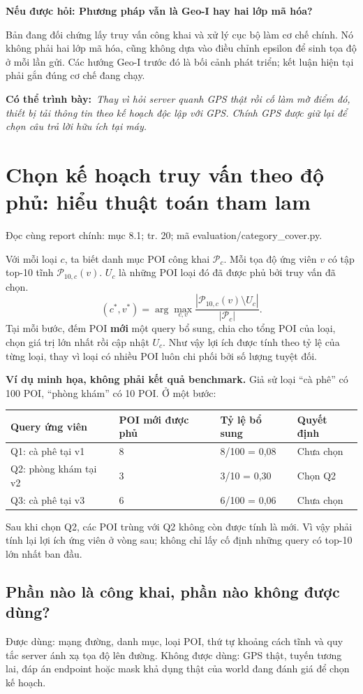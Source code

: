 \documentclass[10pt,a4paper]{article}
\newcommand{\say}[1]{\par\textbf{Có thể trình bày:}\ \textit{#1}\par}
\newcommand{\ask}[2]{\par\textbf{Nếu được hỏi: #1}\par #2\par}
\newcommand{\where}[1]{\par{\small\color{gray}Đọc cùng report chính: #1.}\par}
\newcommand{\example}{\textbf{Ví dụ minh họa, không phải kết quả benchmark.} }
\newcommand{\guidepage}[1]{\clearpage\section{#1}}
\begin{document}
\ask{Phương pháp vẫn là Geo-I hay hai lớp mã hóa?}{Bản đang đối chứng lấy truy vấn công khai và xử lý cục bộ làm cơ chế chính. Nó không phải hai lớp mã hóa, cũng không dựa vào điều chỉnh epsilon để sinh tọa độ ở mỗi lần gửi. Các hướng Geo-I trước đó là bối cảnh phát triển; kết luận hiện tại phải gắn đúng cơ chế đang chạy.}
\say{Thay vì hỏi server quanh GPS thật rồi cố làm mờ điểm đó, thiết bị tải thông tin theo kế hoạch độc lập với GPS. Chính GPS được giữ lại để chọn câu trả lời hữu ích tại máy.}

\guidepage{Chọn kế hoạch truy vấn theo độ phủ: hiểu thuật toán tham lam}
\where{mục 8.1; tr. 20; mã evaluation/category\_cover.py}
Với mỗi loại $c$, ta biết danh mục POI công khai $\mathcal P_c$. Mỗi tọa độ ứng viên $v$ có tập top-10 tĩnh $\mathcal P_{10,c}(v)$. $U_c$ là những POI loại đó đã được phủ bởi truy vấn đã chọn.
\[
(c^*,v^*)=\arg\max_{c,v}\frac{|\mathcal P_{10,c}(v)\setminus U_c|}{|\mathcal P_c|}.
\]
Tại mỗi bước, đếm POI \textbf{mới} một query bổ sung, chia cho tổng POI của loại, chọn giá trị lớn nhất rồi cập nhật $U_c$. Như vậy lợi ích được tính theo tỷ lệ của từng loại, thay vì loại có nhiều POI luôn chi phối bởi số lượng tuyệt đối.

\example Giả sử loại ``cà phê'' có 100 POI, ``phòng khám'' có 10 POI. Ở một bước:
\begin{longtable}{@{}P{4.4cm}P{4.2cm}P{3.7cm}P{3.8cm}@{}}
\toprule Query ứng viên & POI mới được phủ & Tỷ lệ bổ sung & Quyết định\\\midrule
Q1: cà phê tại v1 & 8 & 8/100 = 0,08 & Chưa chọn\\[3pt]
Q2: phòng khám tại v2 & 3 & 3/10 = 0,30 & Chọn Q2\\[3pt]
Q3: cà phê tại v3 & 6 & 6/100 = 0,06 & Chưa chọn\\
\bottomrule
\end{longtable}
Sau khi chọn Q2, các POI trùng với Q2 không còn được tính là mới. Vì vậy phải tính lại lợi ích ứng viên ở vòng sau; không chỉ lấy cố định những query có top-10 lớn nhất ban đầu.

\subsection*{Phần nào là công khai, phần nào không được dùng?}
Được dùng: mạng đường, danh mục, loại POI, thứ tự khoảng cách tĩnh và quy tắc server ánh xạ tọa độ lên đường. Không được dùng: GPS thật, tuyến tương lai, đáp án endpoint hoặc mask khả dụng thật của world đang đánh giá để chọn kế hoạch.
\end{document}
